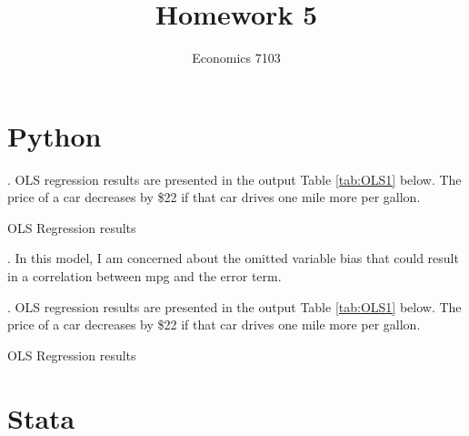\documentclass{article}
\title{Homework 5}
\author{Economics 7103}
\begin{document}
  
\maketitle

\section{Python}
. OLS regression results are presented in the output Table \ref{tab:OLS1} below. The price of a car decreases by \$22 if that car drives one mile more per gallon. 

\begin{table}[h]
    \centering
    
    \caption{OLS Regression results}
    \label{tab:OLS1}
\end{table}

. In this model, I am concerned about the omitted variable bias that could result in a correlation between mpg and the error term.

. OLS regression results are presented in the output Table \ref{tab:OLS1} below. The price of a car decreases by \$22 if that car drives one mile more per gallon. 

\begin{table}[h]
    \centering
    
    \caption{OLS Regression results}
    \label{tab:OLS1}
\end{table}

\clearpage

\section{Stata}
\end{document}
